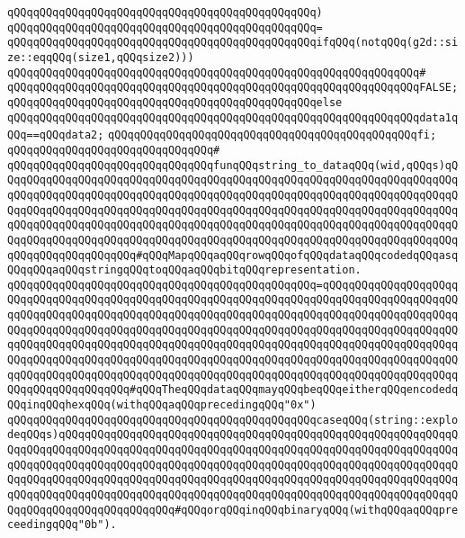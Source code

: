 \verb|qQQqqQQqqQQqqQQqqQQqqQQqqQQqqQQqqQQqqQQqqQQqqQQq)|\newline
\verb|qQQqqQQqqQQqqQQqqQQqqQQqqQQqqQQqqQQqqQQqqQQqqQQq=|\newline
\verb|qQQqqQQqqQQqqQQqqQQqqQQqqQQqqQQqqQQqqQQqqQQqqQQqifqQQq(notqQQq(g2d::size::eqqQQq(size1,qQQqsize2)))|\newline
\verb|qQQqqQQqqQQqqQQqqQQqqQQqqQQqqQQqqQQqqQQqqQQqqQQqqQQqqQQqqQQqqQQq#|\newline
\verb|qQQqqQQqqQQqqQQqqQQqqQQqqQQqqQQqqQQqqQQqqQQqqQQqqQQqqQQqqQQqqQQqFALSE;|\newline
\verb|qQQqqQQqqQQqqQQqqQQqqQQqqQQqqQQqqQQqqQQqqQQqqQQqelse|\newline
\verb|qQQqqQQqqQQqqQQqqQQqqQQqqQQqqQQqqQQqqQQqqQQqqQQqqQQqqQQqqQQqqQQqdata1qQQq==qQQqdata2;|\newline
\verb|qQQqqQQqqQQqqQQqqQQqqQQqqQQqqQQqqQQqqQQqqQQqqQQqfi;|\newline
\newline
\verb|qQQqqQQqqQQqqQQqqQQqqQQqqQQqqQQq#|\newline
\verb|qQQqqQQqqQQqqQQqqQQqqQQqqQQqqQQqfunqQQqstring_to_dataqQQq(wid,qQQqs)qQQqqQQqqQQqqQQqqQQqqQQqqQQqqQQqqQQqqQQqqQQqqQQqqQQqqQQqqQQqqQQqqQQqqQQqqQQqqQQqqQQqqQQqqQQqqQQqqQQqqQQqqQQqqQQqqQQqqQQqqQQqqQQqqQQqqQQqqQQqqQQqqQQqqQQqqQQqqQQqqQQqqQQqqQQqqQQqqQQqqQQqqQQqqQQqqQQqqQQqqQQqqQQqqQQqqQQqqQQqqQQqqQQqqQQqqQQqqQQqqQQqqQQqqQQqqQQqqQQqqQQqqQQqqQQqqQQqqQQqqQQqqQQqqQQqqQQqqQQqqQQqqQQqqQQqqQQqqQQqqQQqqQQqqQQqqQQqqQQqqQQqqQQqqQQqqQQqqQQqqQQqqQQqqQQq#qQQqMapqQQqaqQQqrowqQQqofqQQqdataqQQqcodedqQQqasqQQqqQQqaqQQqstringqQQqtoqQQqaqQQqbitqQQqrepresentation.|\newline
\verb|qQQqqQQqqQQqqQQqqQQqqQQqqQQqqQQqqQQqqQQqqQQqqQQq=qQQqqQQqqQQqqQQqqQQqqQQqqQQqqQQqqQQqqQQqqQQqqQQqqQQqqQQqqQQqqQQqqQQqqQQqqQQqqQQqqQQqqQQqqQQqqQQqqQQqqQQqqQQqqQQqqQQqqQQqqQQqqQQqqQQqqQQqqQQqqQQqqQQqqQQqqQQqqQQqqQQqqQQqqQQqqQQqqQQqqQQqqQQqqQQqqQQqqQQqqQQqqQQqqQQqqQQqqQQqqQQqqQQqqQQqqQQqqQQqqQQqqQQqqQQqqQQqqQQqqQQqqQQqqQQqqQQqqQQqqQQqqQQqqQQqqQQqqQQqqQQqqQQqqQQqqQQqqQQqqQQqqQQqqQQqqQQqqQQqqQQqqQQqqQQqqQQqqQQqqQQqqQQqqQQqqQQqqQQqqQQqqQQqqQQqqQQqqQQqqQQqqQQqqQQqqQQqqQQqqQQqqQQqqQQqqQQqqQQqqQQqqQQqqQQqqQQqqQQq#qQQqTheqQQqdataqQQqmayqQQqbeqQQqeitherqQQqencodedqQQqinqQQqhexqQQq(withqQQqaqQQqprecedingqQQq"0x")|\newline
\verb|qQQqqQQqqQQqqQQqqQQqqQQqqQQqqQQqqQQqqQQqqQQqqQQqcaseqQQq(string::explodeqQQqs)qQQqqQQqqQQqqQQqqQQqqQQqqQQqqQQqqQQqqQQqqQQqqQQqqQQqqQQqqQQqqQQqqQQqqQQqqQQqqQQqqQQqqQQqqQQqqQQqqQQqqQQqqQQqqQQqqQQqqQQqqQQqqQQqqQQqqQQqqQQqqQQqqQQqqQQqqQQqqQQqqQQqqQQqqQQqqQQqqQQqqQQqqQQqqQQqqQQqqQQqqQQqqQQqqQQqqQQqqQQqqQQqqQQqqQQqqQQqqQQqqQQqqQQqqQQqqQQqqQQqqQQqqQQqqQQqqQQqqQQqqQQqqQQqqQQqqQQqqQQqqQQqqQQqqQQqqQQqqQQqqQQqqQQqqQQqqQQqqQQqqQQqqQQqqQQqqQQqqQQqqQQqqQQq#qQQqorqQQqinqQQqbinaryqQQq(withqQQqaqQQqpreceedingqQQq"0b").|\newline
